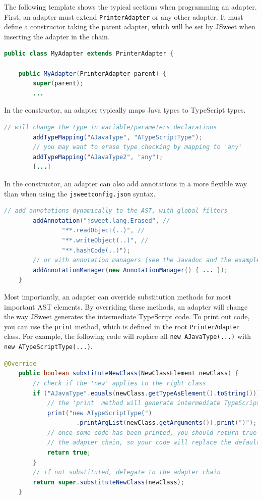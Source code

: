 \documentclass[a4paper]{report}
\begin{document}
The following template shows the typical sections when programming an adapter. First, an adapter must extend \texttt{PrinterAdapter} or any other adapter. It must define a constructor taking the parent adapter, which will be set by JSweet when inserting the adapter in the chain.

\begin{lstlisting}[language=Java]
public class MyAdapter extends PrinterAdapter {

	public MyAdapter(PrinterAdapter parent) {
		super(parent);
		...
\end{lstlisting}

In the constructor, an adapter typically maps Java types to TypeScript types.

\begin{lstlisting}[language=Java]
		// will change the type in variable/parameters declarations
		addTypeMapping("AJavaType", "ATypeScriptType");
		// you may want to erase type checking by mapping to 'any'
		addTypeMapping("AJavaType2", "any");
		[...]
\end{lstlisting}
		
In the constructor, an adapter can also add annotations in a more flexible way than when using the \texttt{jsweetconfig.json} syntax.
		
\begin{lstlisting}[language=Java]
		// add annotations dynamically to the AST, with global filters
		addAnnotation("jsweet.lang.Erased", //
				"**.readObject(..)", //
				"**.writeObject(..)", //
				"**.hashCode(..)");
		// or with annotation managers (see the Javadoc and the example below)		
		addAnnotationManager(new AnnotationManager() { ... });
	}
\end{lstlisting}

Most importantly, an adapter can override substitution methods for most important AST elements. By overriding these methods, an adapter will change the way JSweet generates the intermediate TypeScript code. To print out code, you can use the \texttt{print} method, which is defined in the root \texttt{PrinterAdapter} class. For example, the following code will replace all \texttt{new AJavaType(...)} with \texttt{new ATypeScriptType(...)}.

\begin{lstlisting}[language=Java]
	@Override
	public boolean substituteNewClass(NewClassElement newClass) {
		// check if the 'new' applies to the right class 
		if ("AJavaType".equals(newClass.getTypeAsElement().toString())) {
			// the 'print' method will generate intermediate TypeScript code
			print("new ATypeScriptType(")
					.printArgList(newClass.getArguments()).print(")");
			// once some code has been printed, you should return true to break 
			// the adapter chain, so your code will replace the default one
			return true;
		}
		// if not substituted, delegate to the adapter chain
		return super.substituteNewClass(newClass);
	}
\end{lstlisting}
\end{document}
